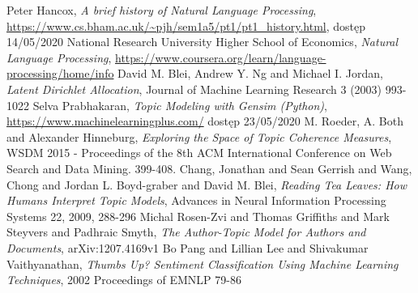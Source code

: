 \documentclass[a4paper,11pt,twoside]{report}
\theoremstyle{definition}
\begin{document}
\begin{thebibliography}{25}%
 Peter Hancox, \textit{A brief history of Natural Language Processing}, \url{https://www.cs.bham.ac.uk/~pjh/sem1a5/pt1/pt1_history.html}, dostęp 14/05/2020
 National Research University Higher School of Economics, \textit{Natural Language Processing}, \url{https://www.coursera.org/learn/language-processing/home/info}
 David M. Blei, Andrew Y. Ng and Michael I. Jordan, \textit{Latent Dirichlet Allocation}, Journal of Machine Learning Research 3 (2003) 993-1022
 Selva Prabhakaran, \textit{Topic Modeling with Gensim (Python)}, \url{https://www.machinelearningplus.com/} dostęp 23/05/2020
 M. Roeder, A. Both and Alexander Hinneburg, \textit{Exploring the Space of Topic Coherence Measures}, WSDM 2015 - Proceedings of the 8th ACM International Conference on Web Search and Data Mining. 399-408.
 Chang, Jonathan and Sean Gerrish and Wang, Chong and Jordan L. Boyd-graber and David M. Blei, \textit{Reading Tea Leaves: How Humans Interpret Topic Models}, Advances in Neural Information Processing Systems 22, 2009, 288-296
 Michal Rosen-Zvi and Thomas Griffiths and Mark Steyvers and Padhraic Smyth, \textit{The Author-Topic Model for Authors and Documents}, arXiv:1207.4169v1
 Bo Pang and Lillian Lee and Shivakumar Vaithyanathan, \textit{Thumbs Up? Sentiment Classification Using Machine Learning Techniques}, 2002 Proceedings of EMNLP 79-86
\end{thebibliography}

\thispagestyle{empty}


\listoffigures
\thispagestyle{empty}


\renewcommand{\listtablename}{Spis tabel}
\listoftables
\thispagestyle{empty}




\thispagestyle{empty}
\end{document}

